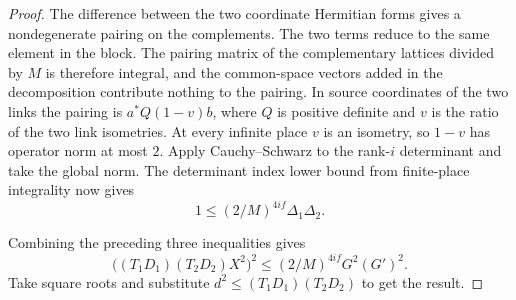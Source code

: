 \begin{proof}
The difference between the two coordinate Hermitian forms gives a nondegenerate pairing on the complements.
The two terms reduce to the same element in the block. The pairing matrix of the complementary lattices divided by $M$ is therefore integral,
and the common-space vectors added in the decomposition contribute nothing to the pairing.
In source coordinates of the two links the pairing is $a^*Q(1-v)b$,
where $Q$ is positive definite and $v$ is the ratio of the two link isometries.
At every infinite place $v$ is an isometry, so $1-v$ has operator norm at most $2$.
Apply Cauchy--Schwarz to the rank-$i$ determinant and take the global norm.
The determinant index lower bound from finite-place integrality now gives
\[
 1\le (2/M)^{4if}\Delta_1\Delta_2.
\]

Combining the preceding three inequalities gives
\[
 \bigl((T_1D_1)(T_2D_2)X^2\bigr)^2
 \le (2/M)^{4if}G^2(G')^2.
\]
Take square roots and substitute $d^2\le (T_1D_1)(T_2D_2)$ to get the result.
\end{proof}

